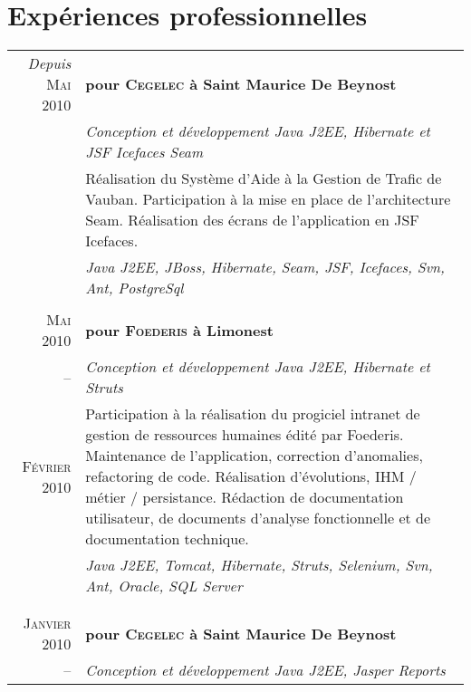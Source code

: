 \documentclass[a4paper,10pt]{article}
\begin{document}
\section{Expériences professionnelles}
\begin{supertabular}{r|p{11cm}}
  \emph{Depuis} \textsc{Mai 2010}  & \textbf{pour \textsc{Cegelec} à Saint Maurice De Beynost}                           \\ 
  & \emph{Conception et développement Java J2EE, Hibernate et JSF Icefaces Seam}                                         \\
  & \footnotesize{Réalisation du Système d'Aide à la Gestion de Trafic de Vauban. Participation à la mise en place de l'architecture Seam. Réalisation des écrans de l'application en JSF Icefaces.} \\
  & \emph{Java J2EE, JBoss, Hibernate, Seam, JSF, Icefaces, Svn, Ant, PostgreSql}                                        \\
                                                                                                     \\
  \textsc{Mai 2010} & \textbf{pour \textsc{Foederis} à Limonest}                                                         \\ 
  -- & \emph{Conception et développement Java J2EE, Hibernate et Struts}                                                 \\
  \footnotesize{\textsc{Février 2010}} & \footnotesize{Participation à la réalisation du progiciel intranet de gestion de ressources humaines édité par Foederis. Maintenance de l'application, correction d'anomalies, refactoring de code. Réalisation d'évolutions, IHM / métier / persistance. Rédaction de documentation utilisateur, de documents d'analyse fonctionnelle et de documentation technique.} \\
  & \emph{Java J2EE, Tomcat, Hibernate, Struts, Selenium, Svn, Ant, Oracle, SQL Server}                                  \\
                                                                                                     \\
                                                                                                     \\
  \textsc{Janvier 2010} & \textbf{pour \textsc{Cegelec} à Saint Maurice De Beynost}                                      \\ 
  -- & \emph{Conception et développement Java J2EE, Jasper Reports}                                                      \\

\end{supertabular}
\end{document}
